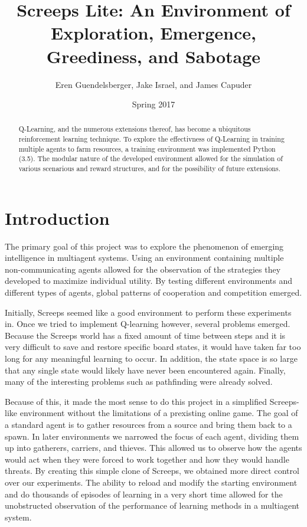 \documentclass[11pt]{article}
\title{Screeps Lite: An Environment of Exploration, Emergence, Greediness, and Sabotage}
\author{Eren Guendelsberger, Jake Israel, and James Capuder}
\date{Spring 2017}
\begin{document}
\maketitle
\thispagestyle{plain}

\begin{abstract}
Q-Learning, and the numerous extensions thereof, has become a ubiquitous reinforcement learning technique. To explore the effectivness of Q-Learning in training multiple agents to farm resources, a training environment was implemented Python (3.5). The modular nature of the developed environment allowed for the simulation of various scenarious and reward structures, and for the possibility of future extensions.
\end{abstract}

\section{Introduction}

	The primary goal of this project was to explore the phenomenon of emerging intelligence in multiagent systems. Using an environment containing multiple non-communicating agents allowed for the observation of the strategies they developed to maximize individual utility. By testing different environments and different types of agents, global patterns of cooperation and competition emerged. 
	
	Initially, Screeps seemed like a good environment to perform these experiments in. Once we tried to implement Q-learning however, several problems emerged. Because the Screeps world has a fixed amount of time between steps and it is very difficult to save and restore specific board states, it would have taken far too long for any meaningful learning to occur. In addition, the state space is so large that any single state would likely have never been encountered again. Finally, many of the interesting problems such as pathfinding were already solved. 
	
	Because of this, it made the most sense to do this project in a simplified Screeps-like environment without the limitations of a prexisting online game. The goal of a standard agent is to gather resources from a source and bring them back to a spawn. In later environments we narrowed the focus of each agent, dividing them up into gatherers, carriers, and thieves. This allowed us to observe how the agents would act when they were forced to work together and how they would handle threats. By creating this simple clone of Screeps, we obtained more direct control over our experiments. The ability to reload and modify the starting environment and do thousands of episodes of learning in a very short time allowed for the unobstructed observation of the performance of learning methods in a multiagent system. 
	
\end{document}
